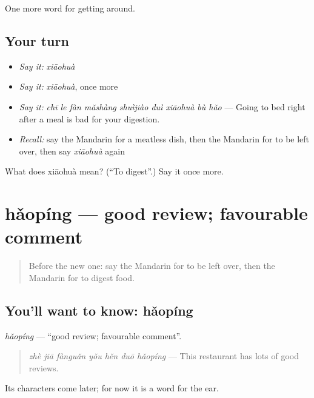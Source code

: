 \begin{grammarlens}[title={What you've built}]
One more word for getting around.
\end{grammarlens}

\subsection*{Your turn}
\begin{itemize}
\raggedright
  \item \emph{Say it:} \emph{xiāohuà}
  \item \emph{Say it:} \emph{xiāohuà}, once more
  \item \emph{Say it:} \emph{chī le fàn mǎshàng shuìjiào duì xiāohuà bù hǎo} — Going to bed right after a meal is bad for your digestion.
  \item \emph{Recall:} say the Mandarin for a meatless dish, then the Mandarin for to be left over, then say \emph{xiāohuà} again
\end{itemize}

\begin{tcolorbox}[breakable,colback=teal!4,colframe=teal!35!black,title={Before you move on}]
What does xiāohuà mean? (\textquotedblleft{}To digest\textquotedblright{}.) Say it once more.
\end{tcolorbox}
\section[hǎopíng]{hǎopíng — good review; favourable comment}

\label{lesson:ZH-C452-haoping}



\begin{quote}
Before the new one: say the Mandarin for to be left over, then the Mandarin for to digest food.
\end{quote}

\subsection*{You'll want to know: hǎopíng}
\emph{hǎopíng} — \textquotedblleft{}good review; favourable comment\textquotedblright{}.

\begin{quote}
\emph{zhè jiā fànguǎn yǒu hěn duō hǎopíng} — This restaurant has lots of good reviews.
\end{quote}

Its characters come later; for now it is a word for the ear.

